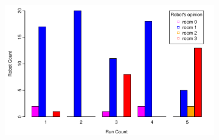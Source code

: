 \documentclass{llncs}
\begin{document}
\begin{figure}[h!]
\begin{subfigure}[b]{0.25\textwidth}
                \label{fig:eval1}
        \end{subfigure}%
        \qquad
        \begin{subfigure}[b]{0.67\textwidth}
                \includegraphics[width=\textwidth]{PLOT/EXP/exp1}
                \label{fig:exp1}
        \end{subfigure}
        

\end{figure}
\end{document}
